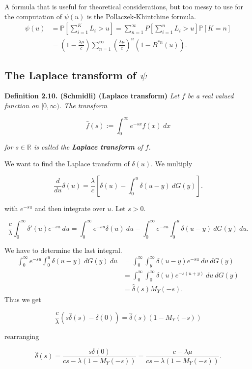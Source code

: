 \documentclass[a4paper,12pt,openany]{book}
\begin{document}
A formula that is useful for theoretical considerations, but too messy to use for the computation of \(\psi(u)\) is the Pollaczek-Khintchine formula.
\begin{align*}
\psi(u)&=\mathbb P\left[\sum_{i=1}^K L_i> u\right]=\sum_{n=1}^\infty P\left[\sum_{i=1}^n L_i> u\right]\mathbb P[K=n]\\
&=\left(1 − \frac{\lambda \mu}{c}\right)\sum_{n=1}^\infty\left(\frac{\lambda \mu}{c}\right)^n(1-B^{*n}(u)).
\end{align*}

\hypertarget{the-laplace-transform-of-psi}{%
\subsection{\texorpdfstring{The Laplace transform of \(\psi\)}{The Laplace transform of \textbackslash psi}}\label{the-laplace-transform-of-psi}}

\textbf{Definition 2.10. (Schmidli) (Laplace transform)} \emph{Let \(f\) be a real valued function on \([0,\infty)\). The transform}

\[
\hat f(s):=\int_0^\infty e^{-sx}f(x)\ dx
\]

\emph{for \(s\in\mathbb R\) is called the \textbf{Laplace transform} of \(f\).}

We want to find the Laplace transform of \(\delta (u)\). We multiply

\[
\frac{d}{du}\delta(u)=\frac{\lambda}{c}\left[\delta(u)-\int_0^u\delta(u-y)\ dG(y)\right].
\]

with \(e^{−su}\) and then integrate over \(u\). Let \(s > 0\).

\[
\frac{c}{\lambda}\int_0^\infty \delta'(u)e^{-su}\ du=\int_0^\infty e^{-su}\delta(u)\ du-\int_0^\infty e^{-su}\int_0^u\delta(u-y)\ dG(y)\ du.
\]

We have to determine the last integral.
\begin{align*}
\int_0^\infty e^{-su}\int_0^u\delta(u-y)\ dG(y)\ du&=\int_0^\infty\int_y^\infty\delta(u-y)e^{-su}\ du\ dG(y)\\
&=\int_0^\infty\int_0^\infty\delta(u)e^{-s(u+y)}\ du\ dG(y)\\
&=\hat \delta(s)M_Y(-s).
\end{align*}
Thus we get

\[
\frac{c}{\lambda}(s\hat \delta(s)-\delta(0))=\hat \delta(s)(1-M_Y(-s))
\]

rearranging

\[
\hat \delta(s)=\frac{s\delta(0)}{cs-\lambda(1-M_Y(-s))}=\frac{c-\lambda \mu}{cs-\lambda(1-M_Y(-s))}.
\]
\end{document}
